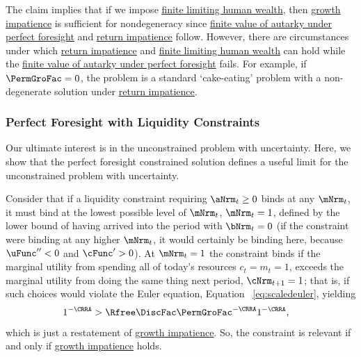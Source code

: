 \documentclass[\econtexRoot/BufferStockTheory]{subfiles}
\begin{document}
The claim implies that if we impose \hyperlink{FHWC}{finite limiting  human wealth}, then  \hyperlink{GICRaw}{growth impatience} is sufficient for nondegeneracy since \hyperlink{PFFVAC}{finite value of autarky under perfect foresight} and \hyperlink{RIC}{return impatience} follow.
However, there are circumstances under which \hyperlink{RIC}{return impatience} and \hyperlink{FHWC}{finite limiting  human wealth} can hold while the \hyperlink{PFFVAC}{finite value of autarky under perfect foresight} fails.
For example, if $\PermGroFac=0$, the problem is a standard `cake-eating' problem with a non-degenerate solution under \hyperlink{RIC}{return impatience}.


\subsubsection{Perfect Foresight with Liquidity Constraints}

Our ultimate interest is in the unconstrained problem with uncertainty.
Here, we show that the perfect foresight constrained solution defines a useful limit for the unconstrained problem with uncertainty.

Consider that if a liquidity constraint requiring $\aNrm_{t} \geq 0$ binds at any $\mNrm_{t}$, it must bind at the lowest possible level of $\mNrm_{t}$, $\mNrm_{t}=1$, defined by the lower bound of having arrived into the period with $\bNrm_{t}=0$ (if the constraint were binding at any higher $\mNrm_{t}$, it would certainly be binding here, because $\uFunc^{\prime\prime}<0$ and $\cFunc^{\prime}>0$).
At $\mNrm_{t}=1$ the constraint binds if the marginal utility from spending all of today's resources $c_{t}=m_{t}=1$, exceeds the marginal utility from doing the same thing next period, $\cNrm_{t+1}=1$; that is, if such choices would violate the Euler equation, Equation ~\eqref{eq:scaledeuler}, yielding
\begin{equation}\begin{gathered}\begin{aligned}
  1^{-\CRRA}  & > \Rfree \DiscFac \PermGroFac^{-\CRRA}1^{-\CRRA},  \label{eq:LiqConstrBinds}
\end{aligned}\end{gathered}\end{equation}
which is just a restatement of \hyperlink{GICRaw}{growth impatience}.
So, the constraint is relevant if and only if \hyperlink{GICRaw}{growth impatience} holds.
\end{document}

